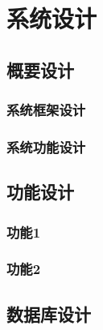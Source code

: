 \documentclass[twoside,11pt]{article}
\begin{document}
\newpage



\begin{center}
    \tableofcontents
\end{center}
\thispagestyle{empty}
\newpage





\section{系统设计}
\subsection{概要设计}
\subsubsection{系统框架设计}
\subsubsection{系统功能设计}
\subsection{功能设计}
\subsubsection{功能1}
\subsubsection{功能2}
\subsection{数据库设计}
\end{document}
